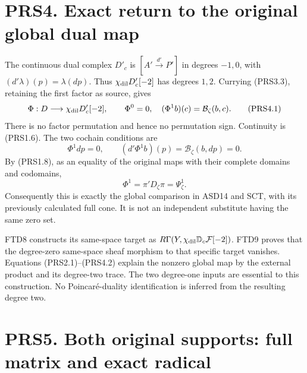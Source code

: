 \section{PRS4. Exact return to the original global dual
map}\label{prs4.-exact-return-to-the-original-global-dual-map}

The continuous dual complex \(D'_c\) is \([A'\xrightarrow{d'}P']\) in
degrees \(-1,0\), with \((d'\lambda)(p)=\lambda(dp)\). Thus
\(\chi_{\rm dil}D'_c[-2]\) has degrees \(1,2\). Currying (PRS3.3),
retaining the first factor as source, gives \[
\Phi:D\longrightarrow\chi_{\rm dil}D'_c[-2],\qquad
\Phi^0=0,\quad (\Phi^1b)(c)=\mathcal B_\zeta(b,c).
\tag{PRS4.1}
\] There is no factor permutation and hence no permutation sign.
Continuity is (PRS1.6). The two cochain conditions are \[
\Phi^1dp=0,\qquad (d'\Phi^1b)(p)=\mathcal B_\zeta(b,dp)=0.
\] By (PRS1.8), as an equality of the original maps with their complete
domains and codomains, \[
\boxed{\Phi^1=\pi'D_\zeta\pi=\Psi_\zeta^1.}
\tag{PRS4.2}
\] Consequently this is exactly the global comparison in ASD14 and SCT,
with its previously calculated full cone. It is not an independent
substitute having the same zero set.

FTD8 constructs its same-space target as
\(R\Gamma(Y,\chi_{\rm dil}\mathbb D_c\mathcal F[-2])\). FTD9 proves that
the degree-zero same-space sheaf morphism to that specific target
vanishes. Equations (PRS2.1)--(PRS4.2) explain the nonzero global map by
the external product and its degree-two trace. The two degree-one inputs
are essential to this construction. No Poincaré-duality identification
is inferred from the resulting degree two.

\section{PRS5. Both original supports: full matrix and exact
radical}\label{prs5.-both-original-supports-full-matrix-and-exact-radical}


